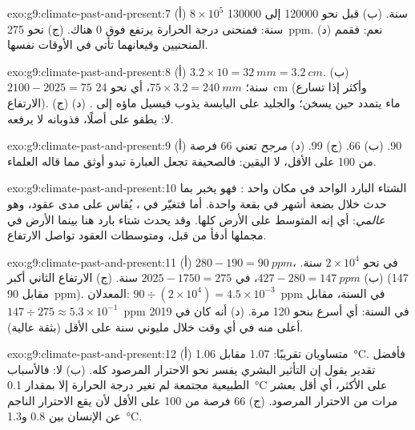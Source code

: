 \begin{solution}{exo:g9:climate-past-and-present:7}
(أ) $8 \times 10^5$ سنة. (ب) قبل نحو \num{120000} إلى \num{130000} سنة:
فمنحنى درجة الحرارة يرتفع فوق 0 هناك. (ج) نحو \qty{275}{ppm}. (د) نعم: فقمم
المنحنيين وقيعانهما تأتي في الأوقات نفسها.
\end{solution}

\begin{solution}{exo:g9:climate-past-and-present:8}
(أ) $3.2 \times 10 = \qty{32}{mm} = \qty{3.2}{cm}$. (ب) $2100 - 2025 =
75$ سنة؛ $75 \times 3.2 = \qty{240}{mm}$، أي نحو \qty{24}{cm} (وأكثر إذا
تسارع الارتفاع). (ج) ماء  يتمدد حين يسخن؛ والجليد على اليابسة يذوب فيسيل
ماؤه إلى . (د) لا:  يطفو على  أصلًا، فذوبانه لا
يرفعه.
\end{solution}

\begin{solution}{exo:g9:climate-past-and-present:9}
(أ) 90. (ب) 66. (ج) 99. (د) \emph{مرجح} تعني 66 فرصة من 100 على الأقل، لا
اليقين: فالصحيفة تجعل العبارة تبدو أوثق مما قاله
العلماء.
\end{solution}

\begin{solution}{exo:g9:climate-past-and-present:10}
الشتاء البارد الواحد في مكان واحد \emph{}: فهو يخبر بما حدث خلال بضعة
أشهر في بقعة واحدة. أما  فتغيّر في \emph{}، يُقاس على
مدى عقود، وهو \emph{عالمي}: أي إنه المتوسط على الأرض كلها. وقد يحدث شتاء بارد
هنا بينما الأرض في مجملها أدفأ من قبل، ومتوسطات العقود تواصل
الارتفاع.
\end{solution}

\begin{solution}{exo:g9:climate-past-and-present:11}
(أ) $280 - 190 = \qty{90}{ppm}$، في نحو $2 \times 10^4$ سنة. (ب) $427
- 280 = \qty{147}{ppm}$، في $2025 - 1750 = 275$ سنة. (ج) الارتفاع الثاني
أكبر (147 مقابل 90~ppm). المعدلان: $90 \div (2 \times 10^4) =
4.5 \times 10^{-3}$~ppm في السنة، مقابل $147 \div 275 \approx 5.3 \times
10^{-1}$~ppm في السنة: أي أسرع بنحو 120 مرة. (د) أنه كان في 2019 أعلى منه
في أي وقت خلال مليوني سنة على الأقل (بثقة عالية).
\end{solution}

\begin{solution}{exo:g9:climate-past-and-present:12}
(أ) متساويان تقريبًا: 1.07 مقابل \qty{1.06}{\degreeCelsius}. فأفضل تقدير يقول
إن التأثير البشري يفسر نحو الاحترار المرصود كله. (ب) لا: فالأسباب الطبيعية
مجتمعة لم تغير درجة الحرارة إلا بمقدار \qty{0.1}{\degreeCelsius} على الأكثر، أي
أقل بعشر مرات من الاحترار المرصود. (ج) 66 فرصة من 100 على الأقل لأن يقع
الاحترار الناجم عن الإنسان بين 0.8 و\qty{1.3}{\degreeCelsius}.
\end{solution}

